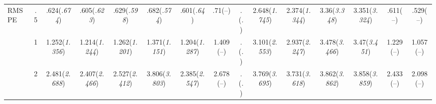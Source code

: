 \documentclass{article}
\begin{document}
\begin{table}[tbp]
{\begin{tabularx}{\textwidth}{lCCCCCCCCCCCCCC}
\midrule RMSPE&.5&.624\newline (\emph{.674})&.605\newline (\emph{.623})&.629\newline (\emph{.598})&.682\newline (\emph{.574})&.601\newline (\emph{.64})&.71\newline (--)&.\newline (\emph{.})&2.648\newline (\emph{1.745})&2.374\newline (\emph{1.344})&3.36\newline (\emph{3.348})&3.351\newline (\emph{3.324})&.611\newline (--)&.529\newline (--) \tabularnewline
&1&1.252\newline (\emph{1.356})&1.214\newline (\emph{1.244})&1.262\newline (\emph{1.201})&1.371\newline (\emph{1.151})&1.204\newline (\emph{1.287})&1.409\newline (--)&.\newline (\emph{.})&3.101\newline (\emph{2.553})&2.937\newline (\emph{2.247})&3.478\newline (\emph{3.466})&3.47\newline (\emph{3.451})&1.229\newline (--)&1.057\newline (--) \tabularnewline
&2&2.481\newline (\emph{2.688})&2.407\newline (\emph{2.466})&2.527\newline (\emph{2.412})&3.806\newline (\emph{3.803})&2.385\newline (\emph{2.547})&2.678\newline (--)&.\newline (\emph{.})&3.769\newline (\emph{3.695})&3.731\newline (\emph{3.618})&3.862\newline (\emph{3.862})&3.858\newline (\emph{3.859})&2.433\newline (--)&2.098\newline (--) \tabularnewline

\end{tabularx}}
\end{table}
\end{document}
